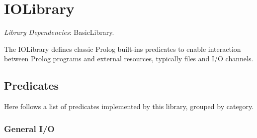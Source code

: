 \section{IOLibrary}

\noindent \emph{Library Dependencies}: BasicLibrary.

The IOLibrary defines classic Prolog built-ins predicates to enable
interaction between Prolog programs and external resources, typically
files and I/O channels.

\subsection{Predicates}

\noindent Here follows a list of predicates implemented by this
library, grouped by category.

\subsubsection{General I/O}

